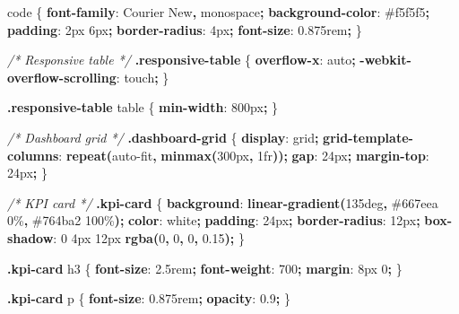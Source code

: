 \documentclass[
]{article}
\newenvironment{Shaded}{\begin{snugshade}}{\end{snugshade}}
\newcommand{\BuiltInTok}[1]{#1}
\newcommand{\CommentTok}[1]{\textcolor[rgb]{0.56,0.35,0.01}{\textit{#1}}}
\newcommand{\ConstantTok}[1]{\textcolor[rgb]{0.56,0.35,0.01}{#1}}
\newcommand{\DataTypeTok}[1]{\textcolor[rgb]{0.13,0.29,0.53}{#1}}
\newcommand{\DecValTok}[1]{\textcolor[rgb]{0.00,0.00,0.81}{#1}}
\newcommand{\FunctionTok}[1]{\textcolor[rgb]{0.13,0.29,0.53}{\textbf{#1}}}
\newcommand{\KeywordTok}[1]{\textcolor[rgb]{0.13,0.29,0.53}{\textbf{#1}}}
\newcommand{\NormalTok}[1]{#1}
\newcommand{\OperatorTok}[1]{\textcolor[rgb]{0.81,0.36,0.00}{\textbf{#1}}}
\newcommand{\StringTok}[1]{\textcolor[rgb]{0.31,0.60,0.02}{#1}}
\begin{document}
\begin{Shaded}
\begin{Highlighting}[]
\NormalTok{code \{}
  \KeywordTok{font{-}family}\NormalTok{: }\StringTok{\textquotesingle{}Courier New\textquotesingle{}}\OperatorTok{,} \DecValTok{monospace}\OperatorTok{;}
  \KeywordTok{background{-}color}\NormalTok{: }\ConstantTok{\#f5f5f5}\OperatorTok{;}
  \KeywordTok{padding}\NormalTok{: }\DecValTok{2}\DataTypeTok{px} \DecValTok{6}\DataTypeTok{px}\OperatorTok{;}
  \KeywordTok{border{-}radius}\NormalTok{: }\DecValTok{4}\DataTypeTok{px}\OperatorTok{;}
  \KeywordTok{font{-}size}\NormalTok{: }\DecValTok{0.875}\DataTypeTok{rem}\OperatorTok{;}
\NormalTok{\}}

\CommentTok{/* Responsive table */}
\FunctionTok{.responsive{-}table}\NormalTok{ \{}
  \KeywordTok{overflow{-}x}\NormalTok{: }\BuiltInTok{auto}\OperatorTok{;}
  \KeywordTok{{-}webkit{-}overflow{-}scrolling}\NormalTok{: touch}\OperatorTok{;}
\NormalTok{\}}

\FunctionTok{.responsive{-}table}\NormalTok{ table \{}
  \KeywordTok{min{-}width}\NormalTok{: }\DecValTok{800}\DataTypeTok{px}\OperatorTok{;}
\NormalTok{\}}

\CommentTok{/* Dashboard grid */}
\FunctionTok{.dashboard{-}grid}\NormalTok{ \{}
  \KeywordTok{display}\NormalTok{: }\DecValTok{grid}\OperatorTok{;}
  \KeywordTok{grid{-}template{-}columns}\NormalTok{: }\FunctionTok{repeat(}\NormalTok{auto{-}fit}\OperatorTok{,} \FunctionTok{minmax(}\DecValTok{300}\DataTypeTok{px}\OperatorTok{,} \DecValTok{1}\DataTypeTok{fr}\FunctionTok{))}\OperatorTok{;}
  \KeywordTok{gap}\NormalTok{: }\DecValTok{24}\DataTypeTok{px}\OperatorTok{;}
  \KeywordTok{margin{-}top}\NormalTok{: }\DecValTok{24}\DataTypeTok{px}\OperatorTok{;}
\NormalTok{\}}

\CommentTok{/* KPI card */}
\FunctionTok{.kpi{-}card}\NormalTok{ \{}
  \KeywordTok{background}\NormalTok{: }\FunctionTok{linear{-}gradient(}\DecValTok{135}\DataTypeTok{deg}\OperatorTok{,} \ConstantTok{\#667eea} \DecValTok{0}\DataTypeTok{\%}\OperatorTok{,} \ConstantTok{\#764ba2} \DecValTok{100}\DataTypeTok{\%}\FunctionTok{)}\OperatorTok{;}
  \KeywordTok{color}\NormalTok{: }\ConstantTok{white}\OperatorTok{;}
  \KeywordTok{padding}\NormalTok{: }\DecValTok{24}\DataTypeTok{px}\OperatorTok{;}
  \KeywordTok{border{-}radius}\NormalTok{: }\DecValTok{12}\DataTypeTok{px}\OperatorTok{;}
  \KeywordTok{box{-}shadow}\NormalTok{: }\DecValTok{0} \DecValTok{4}\DataTypeTok{px} \DecValTok{12}\DataTypeTok{px} \FunctionTok{rgba(}\DecValTok{0}\OperatorTok{,} \DecValTok{0}\OperatorTok{,} \DecValTok{0}\OperatorTok{,} \DecValTok{0.15}\FunctionTok{)}\OperatorTok{;}
\NormalTok{\}}

\FunctionTok{.kpi{-}card}\NormalTok{ h3 \{}
  \KeywordTok{font{-}size}\NormalTok{: }\DecValTok{2.5}\DataTypeTok{rem}\OperatorTok{;}
  \KeywordTok{font{-}weight}\NormalTok{: }\DecValTok{700}\OperatorTok{;}
  \KeywordTok{margin}\NormalTok{: }\DecValTok{8}\DataTypeTok{px} \DecValTok{0}\OperatorTok{;}
\NormalTok{\}}

\FunctionTok{.kpi{-}card}\NormalTok{ p \{}
  \KeywordTok{font{-}size}\NormalTok{: }\DecValTok{0.875}\DataTypeTok{rem}\OperatorTok{;}
  \KeywordTok{opacity}\NormalTok{: }\DecValTok{0.9}\OperatorTok{;}
\NormalTok{\}}
\end{Highlighting}
\end{Shaded}
\end{document}
